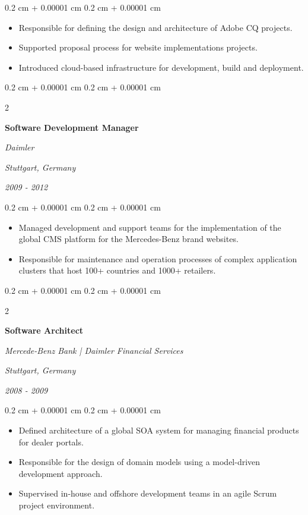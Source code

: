 \documentclass[10pt, letterpaper]{article}
\newenvironment{highlights}{
    \begin{itemize}[
        topsep=0.10 cm,
        parsep=0.10 cm,
        partopsep=0pt,
        itemsep=0pt,
        leftmargin=0.4 cm + 10pt
    ]
}{
    \end{itemize}
} %
\newenvironment{onecolentry}{
    \begin{adjustwidth}{
        0.2 cm + 0.00001 cm
    }{
        0.2 cm + 0.00001 cm
    }
}{
    \end{adjustwidth}
} %
\newenvironment{twocolentry}[2][]{
    \onecolentry
    \def\secondColumn{#2}
    \setcolumnwidth{\fill, 8 cm}
    \begin{paracol}{2}
}{
    \switchcolumn \raggedleft \secondColumn
    \end{paracol}
    \endonecolentry
} %
\begin{document}
\vspace{0.10 cm}
\begin{onecolentry}
    \begin{highlights}
        \item Responsible for defining the design and architecture of Adobe CQ projects.
        \item Supported proposal process for website implementations projects.
        \item Introduced cloud-based infrastructure for development, build and deployment.
    \end{highlights}
\end{onecolentry}

\vspace{0.20 cm}



%
%
\begin{twocolentry}{
        \textit{Stuttgart, Germany}

        \textit{2009 - 2012}}
    \textbf{Software Development Manager}

    \textit{Daimler}
\end{twocolentry}

\vspace{0.10 cm}
\begin{onecolentry}
    \begin{highlights}
        \item Managed development and support teams for the implementation of the global CMS platform for the Mercedes-Benz brand websites.
        \item Responsible for maintenance and operation processes of complex application clusters that host 100+ countries and 1000+ retailers.
    \end{highlights}
\end{onecolentry}

\vspace{0.20 cm}



%
%
\begin{twocolentry}{
        \textit{Stuttgart, Germany}

        \textit{2008 - 2009}}
    \textbf{Software Architect}

    \textit{Mercede-Benz Bank | Daimler Financial Services}
\end{twocolentry}

\vspace{0.10 cm}
\begin{onecolentry}
    \begin{highlights}
        \item Defined architecture of a global SOA system for managing financial products for dealer portals.
        \item Responsible for the design of domain models using a model-driven development approach.
        \item Supervised in-house and offshore development teams in an agile Scrum project environment.
    \end{highlights}
\end{onecolentry}
\end{document}
